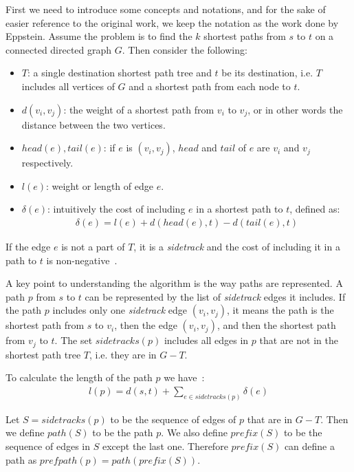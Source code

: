 First we need to introduce some concepts and notations, and for the sake of easier reference to the original work, we keep the notation as the work done by Eppstein.
Assume the problem is to find the $k$ shortest paths from $s$ to $t$ on a connected directed graph $G$. Then consider the following:
\begin{itemize}
\item $T$: a single destination shortest path tree and $t$ be its destination, i.e. $T$ includes all vertices of $G$ and a shortest path from each node to $t$.
\item $d(v_i, v_j)$: the weight of a shortest path from $v_i$ to $v_j$, or in other words the distance between the two vertices.
\item $head(e), tail(e)$: if $e$ is $(v_i, v_j)$, $head$ and $tail$ of $e$ are $v_i$ and $v_j$ respectively.
\item $l(e)$: weight or length of edge $e$.
\item $\delta(e)$: intuitively the cost of including $e$ in a shortest path to $t$, defined as:
  \begin{align}
    \delta(e) = l(e) + d(head(e), t) - d(tail(e), t)
  \end{align}
\end{itemize}

If the edge $e$ is not a part of $T$, it is a \emph{sidetrack} and the cost of including it in a path to $t$ is non-negative~\cite[Lemma 1]{eppstein1998finding}.

A key point to understanding the algorithm is the way paths are represented. A path $p$ from $s$ to $t$ can be represented by the list of \emph{sidetrack} edges it includes. If the path $p$ includes only one \emph{sidetrack} edge $(v_i, v_j)$, it means the path is the shortest path from $s$ to $v_i$, then the edge $(v_i, v_j)$, and then the shortest path from $v_j$ to $t$. The set $sidetracks(p)$ includes all edges in $p$ that are not in the shortest path tree $T$, i.e. they are in $G - T$.

To calculate the length of the path $p$ we have~\cite[Lemma 2]{eppstein1998finding}:
\begin{align}
  l(p) = d(s, t) + \sum_{e \in sidetracks(p)} \delta(e)
\end{align}

Let $S = sidetracks(p)$ to be the sequence of edges of $p$ that are in $G - T$. Then we define $path(S)$ to be the path $p$. We also define $prefix(S)$ to be the sequence of edges in $S$ except the last one. Therefore $prefix(S)$ can define a path as $prefpath(p) = path(prefix(S))$.


